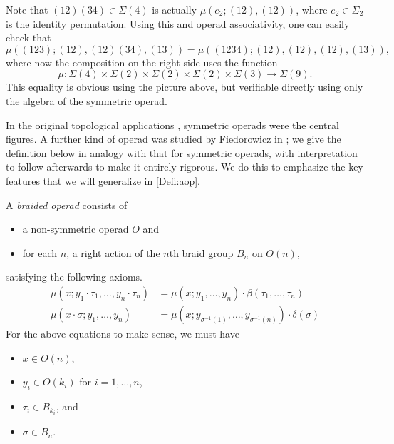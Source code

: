 \begin{example}
Note that $(12)(34) \in \Sigma(4)$ is actually $\mu(e_{2}; (12), (12))$, where $e_{2} \in \Sigma_{2}$ is the identity permutation. Using this and operad associativity, one can easily check that
  \[
    \mu \left( (123); (12), (12)(34), (13) \right) = \mu \left( (1234); (12), (12), (12), (13) \right),
  \]
where now the composition on the right side uses the function
  \[
    \mu \colon \Sigma(4) \times \Sigma(2) \times \Sigma(2) \times \Sigma(2) \times \Sigma(3) \rightarrow \Sigma(9).
  \]
This equality is obvious using the picture above, but verifiable directly using only the algebra of the symmetric operad.
\end{example}


In the original topological applications \cite{maygeom}, symmetric operads were the central figures. A further kind of operad was studied by Fiedorowicz in \cite{fie-br}; we give the definition below in analogy with that for symmetric operads, with interpretation to follow afterwards to make it entirely rigorous. We do this to emphasize the key features that we will generalize in \cref{Defi:aop}.

\begin{Defi}\label{broperad}
A \textit{braided operad} consists of
  \begin{itemize}
    \item a non-symmetric operad $O$ and
    \item for each $n$, a right action of the $n$th braid group $B_{n}$ on $O(n)$,
  \end{itemize}
satisfying the following axioms.
  \begin{align*}
    \mu(x;y_1 \cdot \tau_1,\ldots,y_n \cdot \tau_n) &= \mu(x;y_1,\ldots,y_n)\cdot\beta(\tau_1,\ldots,\tau_n)\\
    \mu(x \cdot \sigma; y_1, \ldots, y_n) &= \mu\left(x;y_{\sigma^{-1}(1)},\ldots,y_{\sigma^{-1}(n)}\right)\cdot \delta(\sigma)
  \end{align*}
For the above equations to make sense, we must have
  \begin{itemize}
      \item $x \in O(n)$,
      \item $y_{i} \in O(k_{i})$ for $i=1, \ldots, n$,
      \item $\tau_{i} \in B_{k_{i}}$, and
      \item $\sigma \in B_{n}$.
  \end{itemize}
\end{Defi}

